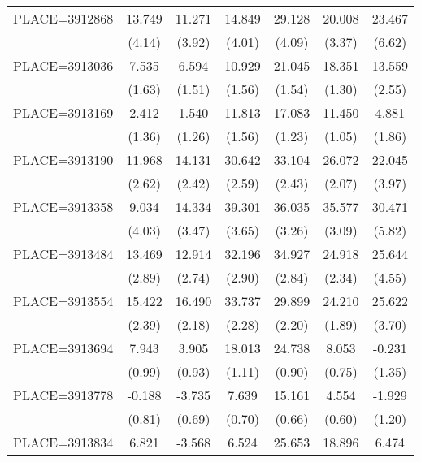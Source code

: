{\begin{tabular}{l*{6}{c}}
PLACE=3912868       &      13.749&      11.271&      14.849&      29.128&      20.008&      23.467\\
                    &      (4.14)&      (3.92)&      (4.01)&      (4.09)&      (3.37)&      (6.62)\\
PLACE=3913036       &       7.535&       6.594&      10.929&      21.045&      18.351&      13.559\\
                    &      (1.63)&      (1.51)&      (1.56)&      (1.54)&      (1.30)&      (2.55)\\
PLACE=3913169       &       2.412&       1.540&      11.813&      17.083&      11.450&       4.881\\
                    &      (1.36)&      (1.26)&      (1.56)&      (1.23)&      (1.05)&      (1.86)\\
PLACE=3913190       &      11.968&      14.131&      30.642&      33.104&      26.072&      22.045\\
                    &      (2.62)&      (2.42)&      (2.59)&      (2.43)&      (2.07)&      (3.97)\\
PLACE=3913358       &       9.034&      14.334&      39.301&      36.035&      35.577&      30.471\\
                    &      (4.03)&      (3.47)&      (3.65)&      (3.26)&      (3.09)&      (5.82)\\
PLACE=3913484       &      13.469&      12.914&      32.196&      34.927&      24.918&      25.644\\
                    &      (2.89)&      (2.74)&      (2.90)&      (2.84)&      (2.34)&      (4.55)\\
PLACE=3913554       &      15.422&      16.490&      33.737&      29.899&      24.210&      25.622\\
                    &      (2.39)&      (2.18)&      (2.28)&      (2.20)&      (1.89)&      (3.70)\\
PLACE=3913694       &       7.943&       3.905&      18.013&      24.738&       8.053&      -0.231\\
                    &      (0.99)&      (0.93)&      (1.11)&      (0.90)&      (0.75)&      (1.35)\\
PLACE=3913778       &      -0.188&      -3.735&       7.639&      15.161&       4.554&      -1.929\\
                    &      (0.81)&      (0.69)&      (0.70)&      (0.66)&      (0.60)&      (1.20)\\
PLACE=3913834       &       6.821&      -3.568&       6.524&      25.653&      18.896&       6.474\\

\end{tabular}}
